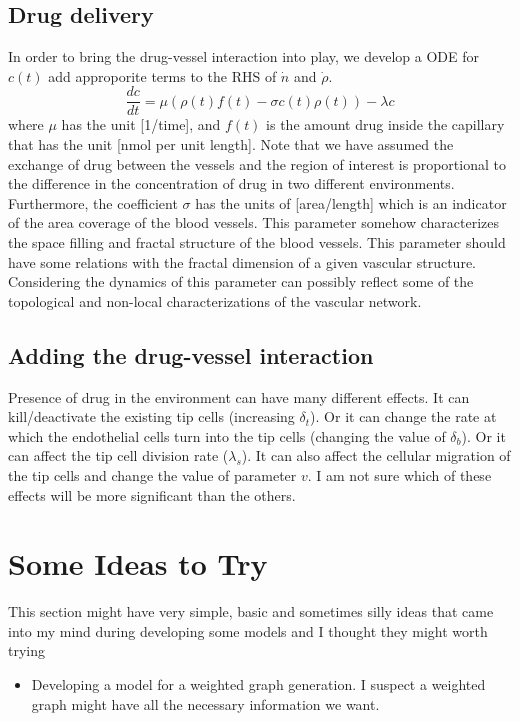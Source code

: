 

\subsection*{Drug delivery}
In order to bring the drug-vessel interaction into play, we develop a ODE for $c(t)$ add approporite terms to the RHS of $\dot{n}$ and $\dot{\rho}$.
\[ \frac{dc}{dt} = \mu (\rho(t)f(t) - \sigma c(t)\rho(t)) - \boxed{\lambda c} \]
where $\mu$ has the unit [1/time], and $f(t)$ is the amount drug inside the capillary that has the unit [nmol per unit length]. Note that we have assumed the exchange of drug between the vessels and the region of interest is proportional to the difference in the concentration of drug in two different environments. Furthermore, the coefficient $\sigma$ has the units of [area/length] which is an indicator of the area coverage of the blood vessels. This parameter somehow characterizes the space filling and fractal structure of the blood vessels. This parameter should have some relations with the fractal dimension of a given vascular structure. Considering the dynamics of this parameter can possibly reflect some of the topological and non-local characterizations of the vascular network.


\subsection*{Adding the drug-vessel interaction}
Presence of drug in the environment can have many different effects. It can kill/deactivate the existing tip cells (increasing $\delta_t$). Or it can change the rate at which the endothelial cells turn into the tip cells (changing the value of $\delta_b$). Or it can affect the tip cell division rate ($\lambda_s$). It can also affect the cellular migration of the tip cells and change the value of parameter $v$. I am not sure which of these effects will be more significant than the others.

\newpage

\section{Some Ideas to Try}
This section might have very simple, basic and sometimes silly ideas that came into my mind during developing some models and I thought they might worth trying
\begin{itemize}
	\item Developing a model for a weighted graph generation. I suspect a weighted graph might have all the necessary information we want.
\end{itemize}